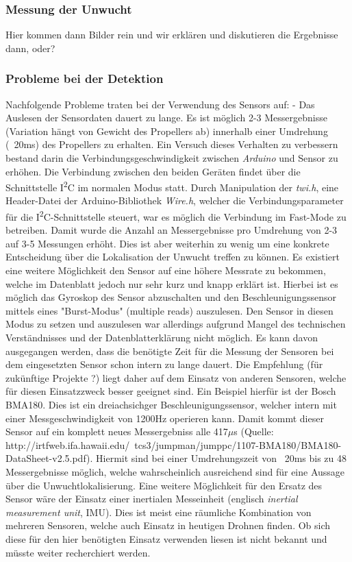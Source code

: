 \subsubsection*{Messung der Unwucht}
Hier kommen dann Bilder rein und wir erklären und diskutieren die Ergebnisse dann, oder?

\subsubsection*{Probleme bei der Detektion}
Nachfolgende Probleme traten bei der Verwendung des Sensors auf:
- Das Auslesen der Sensordaten dauert zu lange. Es ist möglich 2-3 Messergebnisse (Variation hängt von Gewicht des Propellers ab) innerhalb einer Umdrehung (~20ms) des Propellers zu erhalten. Ein Versuch dieses Verhalten zu verbessern bestand darin die Verbindungsgeschwindigkeit zwischen \textit{Arduino} und Sensor zu erhöhen. Die Verbindung zwischen den beiden Geräten findet über die Schnittstelle I\textsuperscript{2}C im normalen Modus statt. Durch Manipulation der \textit{twi.h}, eine Header-Datei der Arduino-Bibliothek \textit{Wire.h}, welcher die Verbindungsparameter für die I\textsuperscript{2}C-Schnittstelle steuert, war es möglich die Verbindung im Fast-Mode zu betreiben. Damit wurde die Anzahl an Messergebnisse pro Umdrehung von 2-3 auf 3-5 Messungen erhöht. Dies ist aber weiterhin zu wenig um eine konkrete Entscheidung über die Lokalisation der Unwucht treffen zu können.
Es existiert eine weitere Möglichkeit den Sensor auf eine höhere Messrate zu bekommen, welche im Datenblatt jedoch nur sehr kurz und knapp erklärt ist. Hierbei ist es möglich das Gyroskop des Sensor abzuschalten und den Beschleunigungssensor mittels eines "Burst-Modus" (multiple reads) auszulesen. Den Sensor in diesen Modus zu setzen und auszulesen war allerdings aufgrund Mangel des technischen Verständnisses und der Datenblatterklärung nicht möglich.
Es kann davon ausgegangen werden, dass die benötigte Zeit für die Messung der Sensoren bei dem eingesetzten Sensor schon intern zu lange dauert. Die Empfehlung (für zukünftige Projekte ?) liegt daher auf dem Einsatz von anderen Sensoren, welche für diesen Einsatzzweck besser geeignet sind. Ein Beispiel hierfür ist der Bosch BMA180. Dies ist ein dreiachsichger Beschleunigungssensor, welcher intern mit einer Messgeschwindigkeit von 1200Hz operieren kann. Damit kommt dieser Sensor auf ein komplett neues Messergebniss alle 417$\mu$s (Quelle: http://irtfweb.ifa.hawaii.edu/~tcs3/jumpman/jumppc/1107-BMA180/BMA180-DataSheet-v2.5.pdf). Hiermit sind bei einer Umdrehungszeit von ~20ms bis zu 48 Messergebnisse möglich, welche wahrscheinlich ausreichend sind für eine Aussage über die Unwuchtlokalisierung. Eine weitere Möglichkeit für den Ersatz des Sensor wäre der Einsatz einer inertialen Messeinheit (englisch \textit{inertial measurement unit}, IMU). Dies ist meist eine räumliche Kombination von mehreren Sensoren, welche auch Einsatz in heutigen Drohnen finden. Ob sich diese für den hier benötigten Einsatz verwenden liesen ist nicht bekannt und müsste weiter recherchiert werden.
